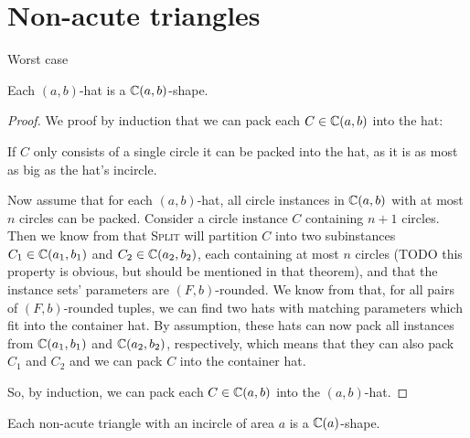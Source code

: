 \documentclass[a4paper,style=print,bibliography=totoc,nexus,lnum,extramargin]{tubsbook}
\begin{document}
\section{Non-acute triangles}

Worst case

\begin{theorem}\label{th:hats}
    Each $(a,b)$-hat is a $\mathbb{C}(a,b)$-shape.
\end{theorem}

\begin{proof}

    We proof by induction that we can pack each $C \in \mathbb{C}(a,b)$ into the hat:

    If $C$ only consists of a single circle it can be packed into the hat, as it is as most as big as the hat's incircle.

    Now assume that for each $(a,b)$-hat, all circle instances in $\mathbb{C}(a,b)$ with at most $n$ circles can be packed. Consider a circle instance $C$ containing $n+1$ circles. Then we know from  that \textsc{Split} will partition $C$ into two subinstances $C_1 \in \mathbb{C}(a_1, b_1)$ and $C_2 \in \mathbb{C}(a_2, b_2)$, each containing at most $n$ circles (TODO this property is obvious, but should be mentioned in that theorem), and that the instance sets' parameters are $(F,b)$-rounded. We know from  that, for all pairs of $(F,b)$-rounded tuples, we can find two hats with matching parameters which fit into the container hat. By assumption, these hats can now pack all instances from $\mathbb{C}(a_1, b_1)$ and $\mathbb{C}(a_2, b_2)$, respectively, which means that they can also pack $C_1$ and $C_2$ and we can pack $C$ into the container hat.

    So, by induction, we can pack each $C \in \mathbb{C}(a,b)$ into the $(a,b)$-hat.
\end{proof}

%

\begin{theorem}
    Each non-acute triangle with an incircle of area $a$ is a $\mathbb{C}(a)$-shape.
\end{theorem}
\end{document}
